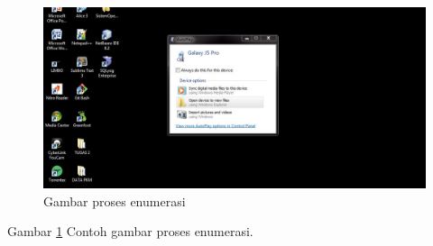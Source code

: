 	
	\begin{figure}[ht]
	\centerline{\includegraphics[width=1\textwidth]{figures/usb2.jpg}}
	\caption{Gambar proses enumerasi}
	\label{Gambar}
	\end{figure}
      
      Gambar \ref{Gambar} Contoh gambar proses enumerasi.
      
      	\cite{kulyukin2004rfid}
	\cite{turang2015pengembangan}

